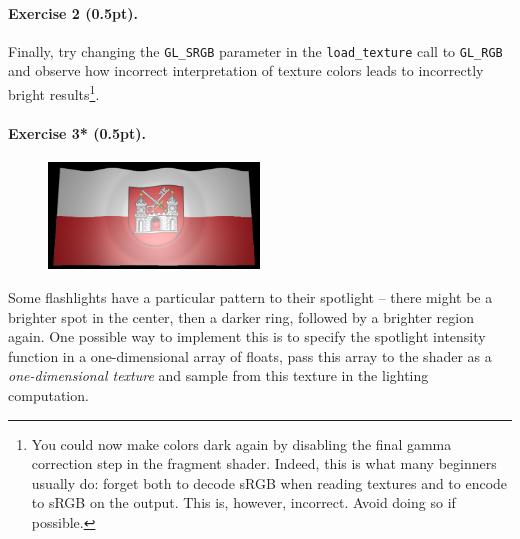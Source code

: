 \documentclass{article}
\newenvironment{exercise}[2]{\paragraph{Exercise #1 (#2pt).} }{
\medskip}
\begin{document}
\begin{exercise}{2}{0.5}
Finally, try changing the \verb#GL_SRGB# parameter in the \verb#load_texture# call to \verb#GL_RGB# and observe how incorrect interpretation of texture colors leads to incorrectly bright results\footnote{You could now make colors dark again by disabling the final gamma correction step in the fragment shader. Indeed, this is what many beginners usually do: forget both to decode sRGB when reading textures and to encode to sRGB on the output. This is, however, incorrect. Avoid doing so if possible.}.
\end{exercise}

\newpage

\begin{exercise}{3*}{0.5}
\begin{figure}
\includegraphics[width=0.5\textwidth]{spotlight.png}
\end{figure}
Some flashlights have a particular pattern to their spotlight -- there might be a brighter spot in the center, then a darker ring, followed by a brighter region again. One possible way to implement this is to specify the spotlight intensity function in a one-dimensional array of floats, pass this array to the shader as a \emph{one-dimensional texture} and sample from this texture in the lighting computation. 


\end{exercise}
\end{document}
